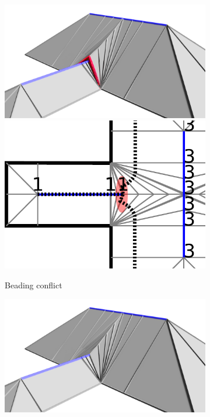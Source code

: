 \begin{figure}\centering
\setlength{\figheight}{.2\columnwidth}
\begin{subfigure}{.45\columnwidth}\centering
\includegraphics[width=\columnwidth]{sources/method/beading_conflict_3D.png}
\includegraphics[height=\figheight]{sources/method/beading_conflict.pdf}
\caption{Beading conflict}\label{beading_conflict}
\end{subfigure}
\begin{subfigure}{.45\columnwidth}\centering
\includegraphics[width=\columnwidth]{sources/method/beading_conflict_solved_3D.png}

\end{subfigure}
\end{figure}
